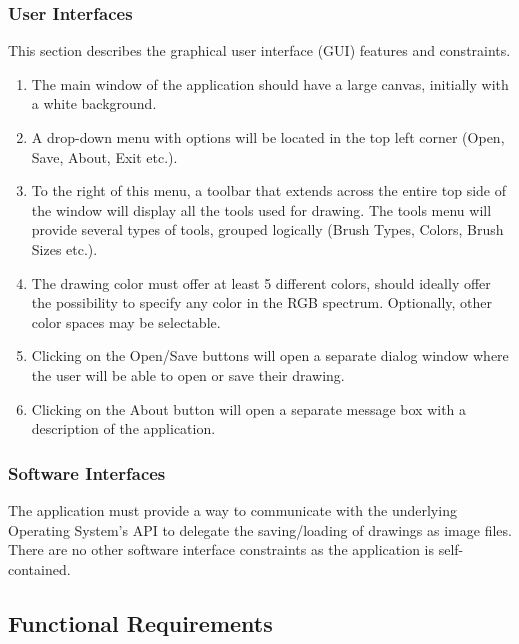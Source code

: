 \documentclass{article}
\begin{document}
\subsubsection{User Interfaces}
This section describes the graphical user interface (GUI) features and constraints.
\begin{enumerate}
\item The main window of the application should have a large canvas, initially with a white background.
\item A drop-down menu with options will be located in the top left corner (Open, Save, About, Exit etc.).
\item To the right of this menu, a toolbar that extends across the entire top side of the window will display all the tools used for drawing. The tools menu will provide several types of tools, grouped logically (Brush Types, Colors, Brush Sizes etc.).
\item The drawing color must offer at least 5 different colors, should ideally offer the possibility to specify any color in the RGB spectrum. Optionally, other color spaces may be selectable.
\item Clicking on the Open/Save buttons will open a separate dialog window where the user will be able to open or save their drawing.
\item Clicking on the About button will open a separate message box with a description of the application.
\end{enumerate}

\subsubsection{Software Interfaces}
The application must provide a way to communicate with the underlying Operating System's API to delegate the saving/loading of drawings as image files. There are no other software interface constraints as the application is self-contained.
\subsection{Functional Requirements}
\end{document}
